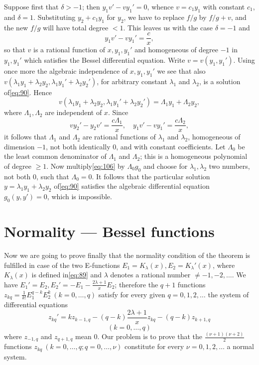Suppose first that $\delta > -1$; then $y_1 v' - v y_1' = 0$, whence $v = c_1 y_1$ with constant $c_1$, and $\delta = 1$. Substituting $y_2 + c_1 y_1$ for $y_2$, we have to replace $f/g$ by $f/g + v$, and the new $f/g$ will have total degree $< 1$. This leaves us with the case $\delta = -1$ and
\[y_1 v' - v y_1' = \frac{c}{x},\]
so that $v$ is a rational function of $x, y_1, y_1'$ and homogeneous of degree $-1$ in $y_1, y_1'$ which satisfies the Bessel differential equation. Write $v = v(y_1, y_1')$. Using once more the algebraic independence of $x, y_1, y_1'$ we see that also $v(\lambda_1 y_1 + \lambda_2 y_2, \lambda_1 y_1' + \lambda_2 y_2')$, for arbitrary constant $\lambda_1$ and $\lambda_2$, is a solution of\eqref{eq:90}. Hence
\begin{equation}
v(\lambda_1 y_1 + \lambda_2 y_2, \lambda_1 y_1' + \lambda_2 y_2') = \Lambda_1 y_1 + \Lambda_2 y_2, \tag{106}\label{eq:106}
\end{equation}
where $\Lambda_1, \Lambda_2$ are independent of $x$. Since
\[v y_2' - y_2 v' = \frac{c \Lambda_1}{x}, \quad y_1 v' - v y_1' = \frac{c \Lambda_2}{x},\]
it follows that $\Lambda_1$ and $\Lambda_2$ are rational functions of $\lambda_1$ and $\lambda_2$, homogeneous of dimension $-1$, not both identically 0, and with constant coefficients. Let $\Lambda_0$ be the least common denominator of $\Lambda_1$ and $\Lambda_2$; this is a homogeneous polynomial of degree $\ge 1$. Now multiply\eqref{eq:106} by $\Lambda_0 g_0$ and choose for $\lambda_1, \lambda_2$ two numbers, not both 0, such that $\Lambda_0 = 0$. It follows that the particular solution $y = \lambda_1 y_1 + \lambda_2 y_2$ of\eqref{eq:90} satisfies the algebraic differential equation $g_0(y, y') = 0$, which is impossible.

\section{Normality --- Bessel functions}\label{sec:13}

Now we are going to prove finally that the normality condition of the theorem is fulfilled in case of the two E-functions $E_1 = K_\lambda(x), E_2 = K_\lambda'(x)$, where $K_\lambda(x)$ is defined in\eqref{eq:89} and $\lambda$ denotes a rational number $\neq -1, -2, \dots$. We have $E_1' = E_2, E_2' = -E_1 - \frac{2\lambda+1}{x} E_2$; therefore the $q+1$ functions $z_{kq} = \frac{1}{k!} E_1^{q-k} E_2^k \ (k=0,\dots,q)$ satisfy for every given $q=0,1,2,\dots$ the system of differential equations
\begin{equation}
z_{kq}' = k z_{k-1, q} - (q-k) \frac{2\lambda+1}{x} z_{kq} - (q-k) z_{k+1, q} \tag{107}\label{eq:107}
\end{equation}
\[(k=0,\dots,q)\]
where $z_{-1, q}$ and $z_{q+1, q}$ mean 0. Our problem is to prove that the $\frac{(\nu+1)(\nu+2)}{2}$ functions $z_{kq} \ (k=0,\dots,q; q=0,\dots,\nu)$ constitute for every $\nu=0,1,2,\dots$ a normal system.


